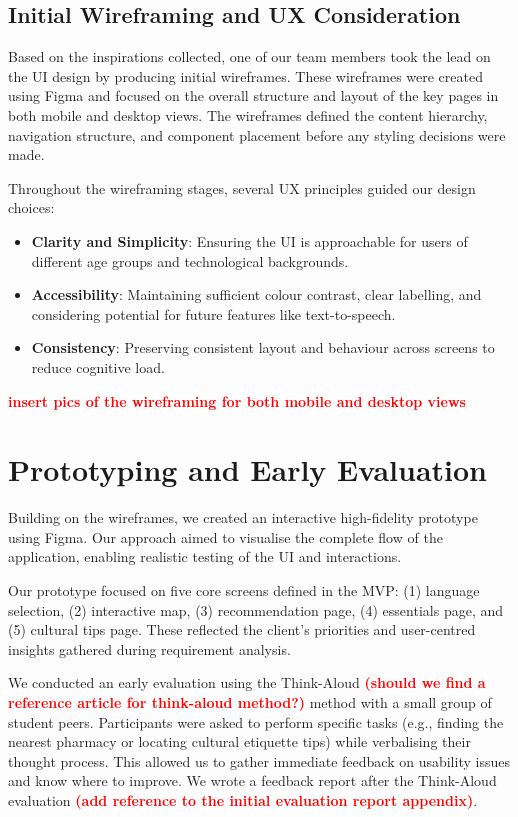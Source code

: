 \subsection{Initial Wireframing and UX Consideration}
Based on the inspirations collected, one of our team members took the lead on the UI design by producing initial wireframes. These wireframes were created using Figma and focused on the overall structure and layout of the key pages in both mobile and desktop views. The wireframes defined the content hierarchy, navigation structure, and component placement before any styling decisions were made.

Throughout the wireframing stages, several UX principles guided our design choices:
    \begin{itemize}
        \item \textbf{Clarity and Simplicity}: Ensuring the UI is approachable for users of different age groups and technological backgrounds.
        \item \textbf{Accessibility}: Maintaining sufficient colour contrast, clear labelling, and considering potential for future features like text-to-speech.
        \item \textbf{Consistency}: Preserving consistent layout and behaviour across screens to reduce cognitive load.
    \end{itemize}

\textbf{\textcolor{red}{insert pics of the wireframing for both mobile and desktop views}}


\section{Prototyping and Early Evaluation}
Building on the wireframes, we created an interactive high-fidelity prototype using Figma. Our approach aimed to visualise the complete flow of the application, enabling realistic testing of the UI and interactions.

Our prototype focused on five core screens defined in the MVP: (1) language selection, (2) interactive map, (3) recommendation page, (4) essentials page, and (5) cultural tips page. These reflected the client's priorities and user-centred insights gathered during requirement analysis.

We conducted an early evaluation using the Think-Aloud \textbf{\textcolor{red}{(should we find a reference article for think-aloud method?)}} method with a small group of student peers. Participants were asked to perform specific tasks (e.g., finding the nearest pharmacy or locating cultural etiquette tips) while verbalising their thought process. This allowed us to gather immediate feedback on usability issues and know where to improve. We wrote a feedback report after the Think-Aloud evaluation \textbf{\textcolor{red}{(add reference to the initial evaluation report appendix)}}.

